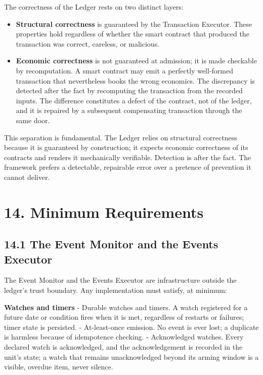 \documentclass[11pt,a4paper]{article}
\newcommand{\clabel}[1]{\leavevmode\hypertarget{clause-#1}{}%
  \marginpar{\raggedright\scriptsize\ttfamily\textcolor{gray}{#1}}}
\providecommand{\tightlist}{\setlength{\itemsep}{2pt}\setlength{\parskip}{0pt}}
\begin{document}
The correctness of the Ledger rests on two distinct layers:

\begin{itemize}
\tightlist
\item
  \clabel{C-13.1}\textbf{Structural correctness} is guaranteed by the Transaction
  Executor. These properties hold regardless of whether the smart
  contract that produced the transaction was correct, careless, or
  malicious.
\item
  \clabel{C-13.2}\textbf{Economic correctness} is not guaranteed at admission; it is
  made checkable by recomputation. A smart contract may emit a perfectly
  well-formed transaction that nevertheless books the wrong economics.
  The discrepancy is detected after the fact by recomputing the
  transaction from the recorded inputs. The difference constitutes a
  defect of the contract, not of the ledger, and it is repaired by a
  subsequent compensating transaction through the same door.
\end{itemize}

This separation is fundamental. \clabel{C-13.3}The Ledger relies on structural
correctness because it is guaranteed by construction; it expects
economic correctness of its contracts and renders it mechanically
verifiable. Detection is after the fact. The framework prefers a
detectable, repairable error over a pretence of prevention it cannot
deliver.

\hypertarget{minimum-requirements}{%
\section{14. Minimum Requirements}\label{minimum-requirements}}

\hypertarget{the-event-monitor-and-the-events-executor}{%
\subsection{14.1 The Event Monitor and the Events
Executor}\label{the-event-monitor-and-the-events-executor}}

\clabel{C-14.1}The Event Monitor and the Events Executor are infrastructure outside the
ledger's trust boundary. Any implementation must satisfy, at minimum:

\textbf{Watches and timers} - \clabel{C-14.2}Durable watches and timers. A watch
registered for a future date or condition fires when it is met,
regardless of restarts or failures; timer state is persisted. -
\clabel{C-14.3}At-least-once emission. No event is ever lost; a duplicate is harmless
because of idempotence checking. - \clabel{C-14.4}Acknowledged watches. Every declared
watch is acknowledged, and the acknowledgement is recorded in the unit's
state; a watch that remains unacknowledged beyond its arming window is a
visible, overdue item, never silence.
\end{document}
